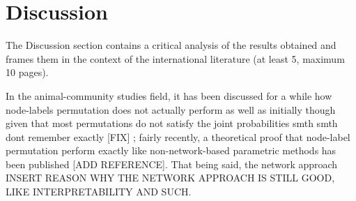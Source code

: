 \graphicspath{{chapters/06_discussion/}}
\chapter{Discussion}

The Discussion section contains a critical analysis of the results obtained and frames them
in the context of the international literature (at least 5, maximum 10 pages).

In the animal-community studies field, it has been discussed for a while how node-labels permutation does not actually perform as well as initially though given that most permutations do not satisfy the joint probabilities smth smth dont remember exactly [FIX] \cite{nullmodel2017}; fairly recently, a theoretical proof that node-label permutation perform exactly like non-network-based parametric methods has been published [ADD REFERENCE]. That being said, the network approach INSERT REASON WHY THE NETWORK APPROACH IS STILL GOOD, LIKE INTERPRETABILITY AND SUCH.